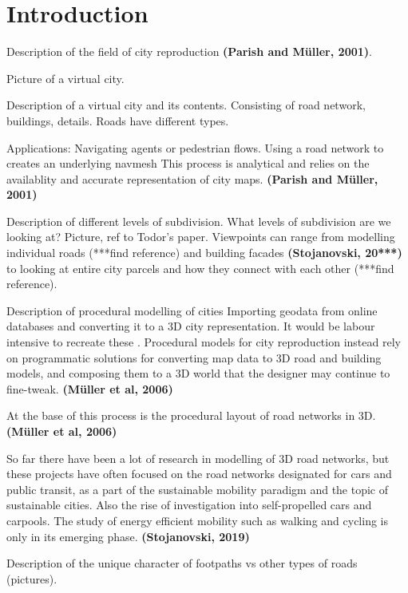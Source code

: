 \documentclass{kththesis}
\begin{document}
\tableofcontents

\mainmatter

\chapter{Introduction}

Description of the field of city reproduction \textbf{(Parish and Müller, 2001)}.

Picture of a virtual city.

Description of a virtual city and its contents.
Consisting of road network, buildings, details.
Roads have different types.

Applications:
    Navigating agents or pedestrian flows.
    Using a road network to creates an underlying navmesh
    This process is analytical and relies on the availablity and accurate representation of city maps.
    \textbf{(Parish and Müller, 2001)}

Description of different levels of subdivision. What levels of subdivision are we looking at? Picture, ref to Todor's paper.
Viewpoints can range from modelling individual roads (***find reference) and building facades \textbf{(Stojanovski, 20***)} to looking at entire city parcels and how they connect with each other (***find reference).

Description of procedural modelling of cities
Importing geodata from online databases and converting it to a 3D city representation.
It would be labour intensive to recreate these .
Procedural models for city reproduction instead rely on programmatic solutions for converting map data to 3D road and building models, and composing them to a 3D world that the designer may continue to fine-tweak.
\textbf{(Müller et al, 2006)}

At the base of this process is the procedural layout of road networks in 3D.
\textbf{(Müller et al, 2006)}

So far there have been a lot of research in modelling of 3D road networks, but these projects have often focused on the road networks designated for cars and public transit, as a part of the sustainable mobility paradigm and the topic of sustainable cities.
Also the rise of investigation into self-propelled cars and carpools.
The study of energy efficient mobility such as walking and cycling is only in its emerging phase. \textbf{(Stojanovski, 2019)}

Description of the unique character of footpaths vs other types of roads (pictures).
\end{document}
